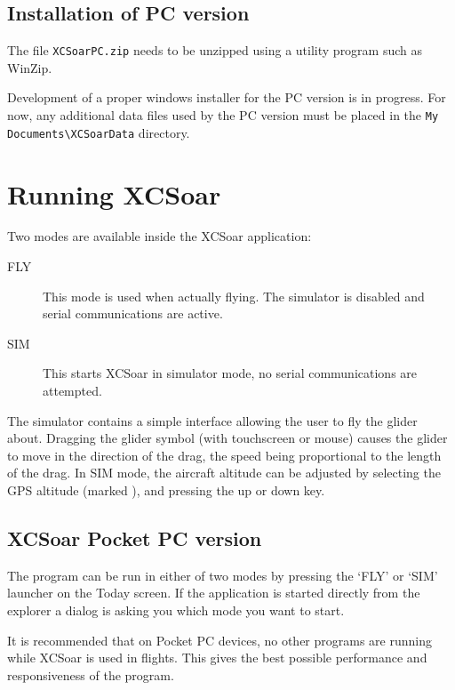 \documentclass[a4paper,12pt]{refrep}
\begin{document}
\subsection*{Installation of PC version}

The file \verb|XCSoarPC.zip| needs to be unzipped using a utility
program such as WinZip.

Development of a proper windows installer for the PC version is in
progress.  For now, any additional data files used by the PC version
must be placed in the \verb|My Documents\XCSoarData| directory.

\section{Running XCSoar}

Two modes are available inside the XCSoar application: 
\begin{description}
\item[FLY] This mode is used when actually flying.  The simulator is 
  disabled and serial communications are active. 
\item[SIM] This starts XCSoar in simulator mode, no serial communications
  are attempted.
\end{description}

The simulator contains a simple interface allowing the user to fly
the glider about.  Dragging the glider symbol (with touchscreen or
mouse) causes the glider to move in the direction of the drag, the
speed being proportional to the length of the drag.  In SIM mode, the
aircraft altitude can be adjusted by selecting the GPS altitude
{\InfoBox} (marked ), and pressing the up or down key.

\subsection*{XCSoar Pocket PC version}
The program can be run in either of two modes by pressing the `FLY' or
`SIM' launcher on the Today screen. If the application is started directly from
the explorer a dialog is asking you which mode you want to start.

\tip It is recommended that on Pocket PC devices, no other programs
 are running while XCSoar is used in flights.  This gives the best
 possible performance and responsiveness of the program.
\end{document}
